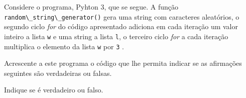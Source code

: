\documentclass[12pt,varwidth=16cm,border=1pt]{standalone}
\begin{document}
Considere o programa, Pyhton 3, que se segue. A função \verb+random\_string\_generator()+ gera uma string com caracteres aleatórios, o segundo ciclo \textit{for} do código apresentado adiciona em cada iteração um valor inteiro a lista \verb+w+ e uma string a lista \verb+l+, o terceiro ciclo \textit{for} a cada iteração multiplica o elemento da lista \verb+w+ por \verb+3+ .



Acrescente a este programa o código que lhe permita indicar se as
afirmações seguintes são verdadeiras ou falsas.

Indique se é verdadeiro ou falso.
\end{document}
